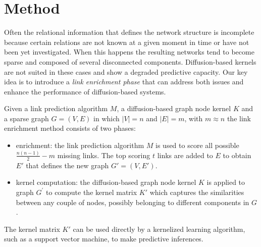 
\section{Method}
\label{method}

Often the relational information that defines the network structure is
incomplete because certain relations are not known at a given moment in time
or have not been yet investigated. When this happens the resulting networks
tend to become sparse and composed of several disconnected components.
Diffusion-based kernels are not suited in these cases and show a degraded
predictive capacity. Our key idea is to introduce a {\em link enrichment
phase} that can address both issues and enhance the performance of diffusion-based systems.

Given a link prediction algorithm $M$, a diffusion-based graph node kernel $K$
and a sparse graph $G=(V, E)$ in which $|V| = n$ and $|E| = m$, with $m
\approx n$ the link enrichment method consists of two phases:

\begin{itemize}

\item enrichment: the link prediction algorithm $M$ is used to score all possible
$\frac{n(n-1)}{2}-m$ missing links. The top scoring $t$ links are added to $E$
to obtain $E'$ that defines the new graph $G'=(V,E')$.

\item kernel computation: the diffusion-based graph node kernel $K$ is applied
to graph $G^{'}$ to compute the kernel matrix $K'$ which captures the similarities
between any couple of nodes, possibly belonging to different components in $G$. 
\end{itemize}

The kernel matrix $K'$ can be used directly by a kernelized learning
algorithm, such as a support vector machine, to make predictive inferences.
